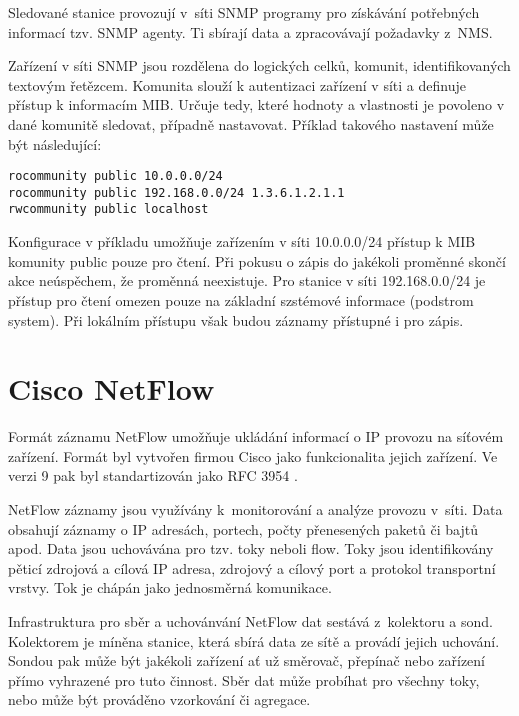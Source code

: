 Sledované stanice provozují v~síti SNMP programy pro získávání potřebných informací tzv. SNMP agenty.
 Ti sbírají data a zpracovávají požadavky z~NMS.

Zařízení v síti SNMP jsou rozdělena do logických celků, komunit, identifikovaných textovým
 řetězcem. Komunita slouží k autentizaci zařízení v síti a definuje přístup k informacím MIB.
 Určuje tedy, které hodnoty a vlastnosti je povoleno v dané komunitě sledovat, případně nastavovat.
 Příklad takového nastavení může být následující: 
\begin{verbatim}
rocommunity public 10.0.0.0/24
rocommunity public 192.168.0.0/24 1.3.6.1.2.1.1
rwcommunity public localhost
\end{verbatim}
Konfigurace v příkladu umožňuje zařízením v síti 10.0.0.0/24 přístup k MIB komunity public pouze
 pro čtení. Při pokusu o zápis do jakékoli proměnné skončí akce neúspěchem, že proměnná neexistuje.
 Pro stanice v síti 192.168.0.0/24 je přístup pro čtení omezen pouze na základní szstémové informace
 (podstrom system). Při lokálním přístupu však budou záznamy přístupné i pro zápis.

\section{Cisco NetFlow}
Formát záznamu NetFlow umožňuje ukládání informací o IP provozu na síťovém zařízení. Formát byl
 vytvořen firmou Cisco jako funkcionalita jejich zařízení. Ve verzi 9 pak byl standartizován
 jako RFC 3954 \cite{rfc3954}.

NetFlow záznamy jsou využívány k~monitorování a analýze provozu v~síti. Data obsahují záznamy
 o IP adresách, portech, počty přenesených paketů či bajtů apod. Data jsou uchovávána pro
 tzv. toky neboli flow. Toky jsou identifikovány pěticí zdrojová a cílová IP adresa,
 zdrojový a cílový port a protokol transportní vrstvy. Tok je chápán jako jednosměrná komunikace.

Infrastruktura pro sběr a uchovánvání NetFlow dat sestává z~kolektoru a sond. Kolektorem je míněna
 stanice, která sbírá data ze sítě a provádí jejich uchování. Sondou pak může být jakékoli zařízení
 ať už směrovač, přepínač nebo zařízení přímo vyhrazené pro tuto činnost. Sběr dat může probíhat
 pro všechny toky, nebo může být prováděno vzorkování či agregace. 

